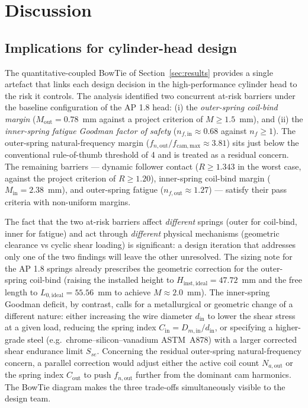 
\section{Discussion}\label{sec:discussion}

\subsection{Implications for cylinder-head design}
\label{sec:disc-design}

The quantitative-coupled BowTie of Section~\ref{sec:results} provides a
single artefact that links each design decision in the high-performance
cylinder head to the risk it controls. The analysis identified two
concurrent at-risk barriers under the baseline configuration of the
AP 1.8 head: (i) the \emph{outer-spring coil-bind margin}
($M_{\mathrm{out}}=0.78$~mm against a project criterion of
$M\geq 1.5$~mm), and (ii) the \emph{inner-spring fatigue Goodman
factor of safety} ($n_{f,\mathrm{in}}\approx 0.68$ against
$n_{f}\geq 1$). The outer-spring natural-frequency margin
($f_{n,\mathrm{out}}/f_{\mathrm{cam,max}}\approx 3.81$) sits just
below the conventional rule-of-thumb threshold of 4 and is treated
as a residual concern. The remaining barriers --- dynamic follower
contact ($R\geq 1.343$ in the worst case, against the project
criterion of $R\geq 1.20$), inner-spring coil-bind margin
($M_{\mathrm{in}}=2.38$~mm), and outer-spring fatigue
($n_{f,\mathrm{out}}\approx 1.27$) --- satisfy their pass criteria
with non-uniform margins.

The fact that the two at-risk barriers affect \emph{different}
springs (outer for coil-bind, inner for fatigue) and act through
\emph{different} physical mechanisms (geometric clearance vs cyclic
shear loading) is significant: a design iteration that addresses
only one of the two findings will leave the other unresolved. The
sizing note for the AP 1.8 springs already prescribes the geometric
correction for the outer-spring coil-bind (raising the installed
height to $H_{\mathrm{inst,ideal}}=47.72$~mm and the free length to
$L_{0,\mathrm{ideal}}=55.56$~mm to achieve $M\approx 2.0$~mm). The
inner-spring Goodman deficit, by contrast, calls for a metallurgical
or geometric change of a different nature: either increasing the
wire diameter $d_{\mathrm{in}}$ to lower the shear stress at a given
load, reducing the spring index
$C_{\mathrm{in}}=D_{m,\mathrm{in}}/d_{\mathrm{in}}$, or specifying
a higher-grade steel (e.g.\ chrome--silicon--vanadium ASTM~A878)
with a larger corrected shear endurance limit $S_{se}$. Concerning
the residual outer-spring natural-frequency concern, a parallel
correction would adjust either the active coil count
$N_{a,\mathrm{out}}$ or the spring index $C_{\mathrm{out}}$ to push
$f_{n,\mathrm{out}}$ further from the dominant cam harmonics. The
BowTie diagram makes the three trade-offs simultaneously visible to
the design team.

